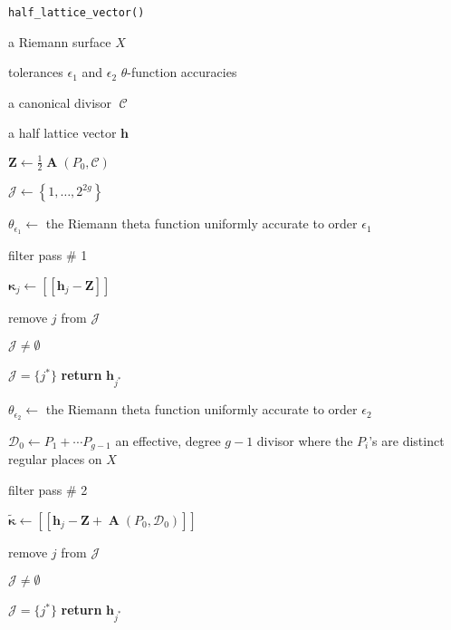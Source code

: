 \documentclass[12pt]{article}
\theoremstyle{definition}
\DeclareMathOperator{\DivC}{\mathcal{C}}
\DeclareMathOperator{\Abel}{\boldsymbol{A}}
\begin{document}
\begin{algorithm}
\caption{\tt half\_lattice\_vector()}
\label{alg: rcv}
\begin{algorithmic}[1]

\Require a Riemann surface $X$

\Require tolerances $\epsilon_1$ and $\epsilon_2$ \Comment
$\theta$-function accuracies

\Require a canonical divisor $\DivC$

\Ensure a half lattice vector $\boldsymbol{h}$

\State $\boldsymbol{Z} \gets \tfrac{1}{2} \Abel(P_0, \mathcal{C})$

\State $\mathcal{J} \gets \left\{ 1, \ldots, 2^{2g} \right\}$

\State $\theta_{\epsilon_1} \gets$ the Riemann theta function uniformly
accurate to order $\epsilon_1$

 \Comment filter pass \# 1

\State $\boldsymbol{\kappa}_j \gets [[\boldsymbol{h}_j -
        \boldsymbol{Z}]]$


        \State remove $j$ from $\mathcal{J}$

    \EndIf

\EndFor

 $\mathcal{J} \neq \emptyset$

 $\mathcal{J} = \{j^*\}$ {\bf return} $\boldsymbol{h}_{j^*}$

\State $\theta_{\epsilon_2} \gets$ the Riemann theta function uniformly
accurate to order $\epsilon_2$

\State $\mathcal{D}_0 \gets P_1 + \cdots P_{g-1}$ an effective, degree
$g-1$ divisor where the $P_i$'s are distinct regular places on $X$

 \Comment filter pass \# 2

    \State $\tilde{\boldsymbol{\kappa}} \gets [[ \boldsymbol{h}_j -
        \boldsymbol{Z} + \Abel(P_0, \mathcal{D}_0) ]]$


        \State remove $j$ from $\mathcal{J}$

    \EndIf

\EndFor

 $\mathcal{J} \neq \emptyset$

 $\mathcal{J} = \{j^*\}$ {\bf return} $\boldsymbol{h}_{j^*}$


\end{algorithmic}
\end{algorithm}
\end{document}
